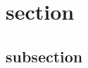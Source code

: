 \documentclass[a4paper, 11pt]{article}
\begin{document}
	
	\pagestyle{fancy}
	\section{section}
	\subsection{subsection}
\end{document}
